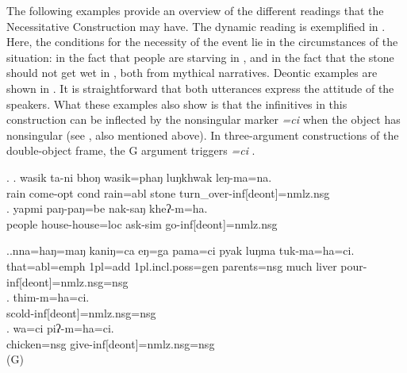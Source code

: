 The following examples provide an overview of the different readings that the Necessitative Construction may have.
The dynamic reading is exemplified in \Next. Here, the conditions for the necessity of the event lie in the circumstances of the situation: in the fact that people are starving in \Next[a], and in the fact that the stone should not get wet in \Next[b], both from mythical narratives. Deontic examples are shown in \NNext. It is straightforward that both utterances express the attitude of the speakers. What these examples also show is that the infinitives in this construction can be inflected by the nonsingular marker \emph{=ci} when the object has nonsingular   (see \NNext, also mentioned above). In three-argument constructions of the double-object frame, the G argument triggers   \emph{=ci}  \NNext[c].


\ex. \ag. wasik  ta-ni bhoŋ wasik=phaŋ luŋkhwak leŋ-ma=na.\\
rain come{\sc [3sg]-opt} {\sc cond} rain{\sc =abl} stone turn\_over-{\sc inf[deont]=nmlz.nsg}\\
\bg. yapmi  paŋ-paŋ=be nak-saŋ kheʔ-m=ha.\\
		people house-house{\sc=loc} ask-{\sc sim} go-{\sc inf[deont]=nmlz.nsg}\\
	 

\ex.\ag.nna=haŋ=maŋ kaniŋ=ca    eŋ=ga  pama=ci pyak luŋma tuk-ma=ha=ci.\\
that{\sc =abl=emph} {\sc 1pl=add} {\sc 1pl.incl.poss=gen} parents{\sc =nsg} much liver pour{\sc -inf[deont]=nmlz.nsg=nsg} \\
	
\bg. thim-m=ha=ci.\\
	scold{\sc -inf[deont]=nmlz.nsg=nsg}\\
\bg. wa=ci piʔ-m=ha=ci.\\
chicken{\sc =nsg} give-{\sc inf[deont]=nmlz.nsg=nsg}\\
 (G)
	
